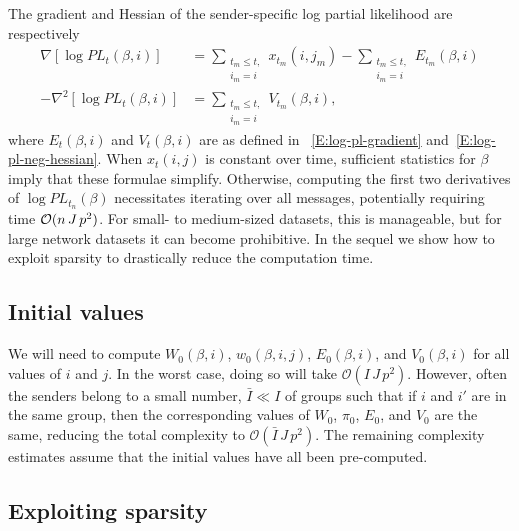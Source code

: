 \documentclass[final]{statsoc}
\begin{document}
The gradient and Hessian of the sender-specific log partial likelihood
are respectively
\begin{subequations}
\begin{align}\label{eq:grad-MPLE}
    \nabla [ \log \mathit{PL}_t(\beta, i) ]
        & =
        \sum_{\substack{t_m \leq t, \\ i_m = i}}
            x_{t_m}\!(i,j_m)
            -\!\!
            \sum_{\substack{t_m \leq t, \\ i_m = i}}
                E_{t_m}(\beta, i) \\
    -\nabla^2 [ \log \mathit{PL}_t(\beta, i) ]
        & =
        \sum_{\substack{t_m \leq t, \\ i_m = i}}
          V_{t_m}(\beta, i),\label{eq:hess-MPLE}
\end{align}
\end{subequations}
where $E_{t}(\beta,i)$ and $V_{t}(\beta, i)$ are as defined in
~\eqref{E:log-pl-gradient} and~\eqref{E:log-pl-neg-hessian}.
When $x_t(i,j)$ is constant over time, sufficient statistics for $\beta$ imply that these formulae simplify.
Otherwise, computing the first two derivatives of
$\log \mathit{PL}_{t_n}(\beta)$
necessitates iterating over all messages, potentially requiring time
$\mathcal{O}(n \, J \, p^2)$.  For small- to medium-sized datasets, this is manageable,
but for large network datasets it can become
prohibitive.  In the sequel we show how to exploit sparsity to drastically
reduce the computation time.

\subsection{Initial values}

We will need to compute $W_0(\beta, i)$, $w_0(\beta, i, j)$, $E_0(\beta,
i)$, and $V_0(\beta, i)$ for all values of $i$ and $j$.  In the worst case,
doing so will take $\mathcal{O}(I \, J \, p^2)$.  However, often the senders
belong to a small number, $\bar I \ll I$ of groups such that if $i$ and $i'$
are in the same group, then the corresponding values of $W_0$, $\pi_0$, $E_0$,
and $V_0$ are the same, reducing the total complexity to $\mathcal{O}(\bar I
\, J \, p^2)$.  The remaining complexity estimates assume that the
initial values have all been pre-computed.


\subsection{Exploiting sparsity}
\end{document}
